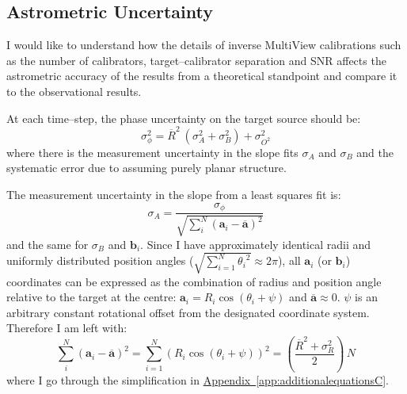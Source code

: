 	\clearpage
	\subsection{Astrometric Uncertainty} \label{sec:astrouncertainty}
		I would like to understand how the details of inverse MultiView calibrations such as the number of calibrators, target--calibrator separation and SNR affects the astrometric accuracy of the results from a theoretical standpoint and compare it to the observational results. 
		
		At each time--step, the phase uncertainty on the target source should be:
		\begin{equation}
			\sigma_\phi^2 = \overline{R}^2~(\sigma_{A}^2 + \sigma_{B}^2)+\sigma_{O^2}^2
			\label{eq:sigmaphi}
		\end{equation} where there is the measurement uncertainty in the slope fits $\sigma_{A}$ and $\sigma_{B}$ and the systematic error due to assuming purely planar structure.
	
		The measurement uncertainty in the slope from a least squares fit is:
		\begin{equation}
			\sigma_{A} = \frac{\sigma_\phi}{\sqrt{\sum_{i}^{N}\left(\textbf{a}_i-\overline{\textbf{a}}\right)^2}}
		\end{equation} and the same for $\sigma_B$ and $\textbf{b}_i$. Since I have approximately identical radii and uniformly distributed position angles ($\sqrt{\sum_{i=1}^{N}{\theta_i}^2}\approx2\pi$), all $\textbf{a}_i$ (or $\textbf{b}_i$) coordinates can be expressed as the combination of radius and position angle relative to the target at the centre: $\textbf{a}_i = R_i\cos\left(\theta_i+\psi\right)$ and $\overline{\textbf{a}}\approx0$. $\psi$ is an arbitrary constant rotational offset from the designated coordinate system. Therefore I am left with:
		\begin{equation*}
			\sum_{i}^{N}\left(\textbf{a}_i-\overline{\textbf{a}}\right)^2 = \sum_{i=1}^{N}\left(R_i\cos\left(\theta_i+\psi\right)\right)^2 = \left(\frac{\overline{R}^2+\sigma_R^2}{2}\right)\,N
		\end{equation*} where I go through the simplification in \hyperref[app:additionalequationsC]{Appendix~\ref*{app:additionalequationsC}}. 
		
